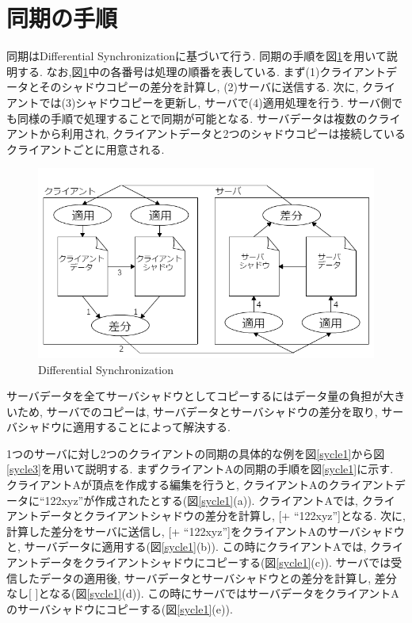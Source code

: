 \section{同期の手順}
同期はDifferential Synchronizationに基づいて行う.
同期の手順を図\ref{differential}を用いて説明する. なお,図\ref{differential}中の各番号は処理の順番を表している. まず(1)クライアントデータとそのシャドウコピーの差分を計算し, (2)サーバに送信する. 次に, クライアントでは(3)シャドウコピーを更新し, サーバで(4)適用処理を行う. サーバ側でも同様の手順で処理することで同期が可能となる. サーバデータは複数のクライアントから利用され, クライアントデータと2つのシャドウコピーは接続しているクライアントごとに用意される.
\begin{figure}[]
  \begin{center}
    \includegraphics[scale=0.7]{images/DS}
    \caption{Differential Synchronization}
    \label{differential}
  \end{center}
\end{figure}
\par
サーバデータを全てサーバシャドウとしてコピーするにはデータ量の負担が大きいため, サーバでのコピーは, サーバデータとサーバシャドウの差分を取り, サーバシャドウに適用することによって解決する.
\par
1つのサーバに対し2つのクライアントの同期の具体的な例を図\ref{sycle1}から図\ref{sycle3}を用いて説明する. まずクライアントAの同期の手順を図\ref{sycle1}に示す.
クライアントAが頂点を作成する編集を行うと, クライアントAのクライアントデータに``122xyz''が作成されたとする(図\ref{sycle1}(a)). クライアントAでは, クライアントデータとクライアントシャドウの差分を計算し, [+ ``122xyz'']となる. 次に, 計算した差分をサーバに送信し, [+ ``122xyz'']をクライアントAのサーバシャドウと, サーバデータに適用する(図\ref{sycle1}(b)). この時にクライアントAでは, クライアントデータをクライアントシャドウにコピーする(図\ref{sycle1}(c)). サーバでは受信したデータの適用後, サーバデータとサーバシャドウとの差分を計算し, 差分なし[ ]となる(図\ref{sycle1}(d)). この時にサーバではサーバデータをクライアントAのサーバシャドウにコピーする(図\ref{sycle1}(e)).
